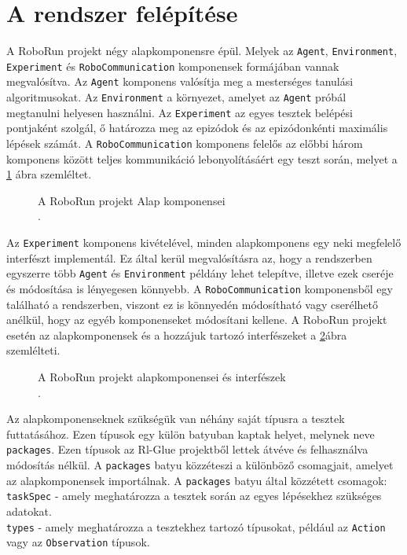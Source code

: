 \section{A rendszer felépítése}\label{sec:Felepites}
A RoboRun projekt négy alapkomponensre épül. Melyek az \texttt{Agent}, \texttt{Environment}, \texttt{Experiment} és \texttt{RoboCommunication} komponensek formájában vannak megvalósítva. Az \texttt{Agent} komponens valósítja meg a mesterséges tanulási algoritmusokat. Az \texttt{Environment} a környezet, amelyet az \texttt{Agent} próbál megtanulni helyesen használni. Az \texttt{Experiment} az egyes tesztek belépési pontjaként szolgál, ő határozza meg az epizódok és az epizódonkénti maximális lépések számát. A \texttt{RoboCommunication} komponens felelős az előbbi három komponens között teljes kommunikáció lebonyolításáért egy teszt során, melyet a \ref{fig:RoboRunAlapKomponensek} ábra szemléltet.

\begin{figure}[h!]
  \centering
  \caption[A RoboRun projekt alapkomponensei]%
  {A RoboRun projekt Alap komponensei\\
  {\white .}\hfill\url{}}
  \label{fig:RoboRunAlapKomponensek}
\end{figure}

Az \texttt{Experiment} komponens kivételével, minden alapkomponens egy neki megfelelő interfészt implementál. Ez által kerül megvalósításra az, hogy a rendszerben egyszerre több \texttt{Agent} és \texttt{Environment} példány lehet telepítve, illetve ezek cseréje és módosítása is lényegesen könnyebb. A \texttt{RoboCommunication} komponensből egy található a rendszerben, viszont ez is könnyedén módosítható vagy cserélhető anélkül, hogy az egyéb komponenseket módosítani kellene.  A RoboRun projekt esetén az alapkomponensek és a hozzájuk tartozó interfészeket a \ref{fig:RoboRunKompEsInterfesz}ábra szemlélteti.

\begin{figure}[h!]
  \centering
  \caption[A RoboRun projekt alapkomponensei és interfészek]%
  {A RoboRun projekt alapkomponensei és interfészek\\
  {\white .}\hfill\url{}}
  \label{fig:RoboRunKompEsInterfesz}
\end{figure}


Az alapkomponenseknek szükségük van néhány saját típusra a tesztek futtatásához. Ezen típusok egy külön batyuban kaptak helyet, melynek neve \texttt{packages}. Ezen típusok az Rl-Glue projektből lettek átvéve és felhasználva módosítás nélkül. A \texttt{packages} batyu közzéteszi a különböző csomagjait, amelyet az alapkomponensek importálnak. A \texttt{packages} batyu által közzétett csomagok:
\\
\texttt{taskSpec} - amely meghatározza a tesztek során az egyes lépésekhez szükséges adatokat.
\\
\texttt{types} - amely meghatározza a tesztekhez tartozó típusokat, például az \texttt{Action} vagy az \texttt{Observation} típusok.

